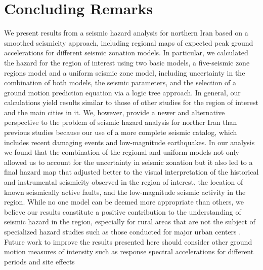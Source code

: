 
\section{Concluding Remarks}

We present results from a seismic hazard analysis for northern Iran based on a smoothed seismicity approach, including regional maps of expected peak ground accelerations for different seismic zonation models. In particular, we calculated the hazard for the region of interest using two basic models, a five-seismic zone regions model and a uniform seismic zone model, including uncertainty in the combination of both models, the seismic parameters, and the selection of a ground motion prediction equation via a logic tree approach. In general, our calculations yield results similar to those of other studies for the region of interest and the main cities in it. We, however, provide a newer and alternative perspective to the problem of seismic hazard analysis for norther Iran than previous studies because our use of a more complete seismic catalog, which includes recent damaging events and low-magnitude earthquakes. In our analysis we found that the combination of the regional and uniform models not only allowed us to account for the uncertainty in seismic zonation but it also led to a final hazard map that adjusted better to the visual interpretation of the historical and instrumental seismicity observed in the region of interest, the location of known seismically active faults, and the low-magnitude seismic activity in the region. While no one model can be deemed more appropriate than others, we believe our results constitute a positive contribution to the understanding of seismic hazard in the region, especially for rural areas that are not the subject of specialized hazard studies such as those conducted for major urban centers . Future work to  improve the results presented here should consider other ground motion measures of intensity such as response spectral accelerations for different periods and site effects


